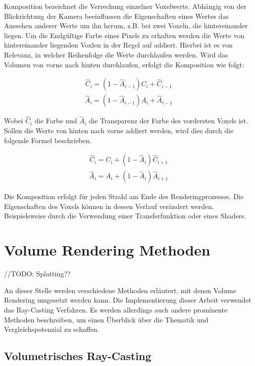 Komposition bezeichnet die Verrechung einzelner Voxelwerte. Abhängig von der Blickrichtung der Kamera beeinflussen die Eigenschaften eines Wertes das Aussehen anderer Werte um ihn herum, z.B. bei zwei Voxeln, die hintereinander liegen. Um die Endgültige Farbe eines Pixels zu erhalten werden die Werte von hintereinander liegenden Voxlen in der Regel auf addiert. Hierbei ist es von Relevanz, in welcher Reihenfolge die Werte durchlaufen werden. Wird das Volumen von vorne nach hinten durchlaufen, erfolgt die Komposition wie folgt:

\begin{align}
\hat{C}_{i}=(1-\hat{A}_{i-1})C_{i}+\hat{C}_{i-1}
\end{align}
\begin{align}
\hat{A}_{i}=(1-\hat{A}_{i-1})A_{i}+\hat{A}_{i-1}
\end{align}


Wobei $\hat{C}_{i}$ die Farbe und $\hat{A}_{i}$ die Transparenz der Farbe des vordersten Voxels ist.
Sollen die Werte von hinten nach vorne addiert werden, wird dies durch die folgende Formel beschrieben.

\begin{align}
\hat{C}_{i}=C_{i}+(1-\hat{A}_{i})\hat{C}_{i+1}
\end{align}
\begin{align}
\hat{A}_{i}=A_{i}+(1-\hat{A}_{i})\hat{A}_{i+1}
\end{align}

Die Komposition erfolgt für jeden Strahl am Ende des Renderingprozesses. Die Eigenschaften des Voxels können in dessen Verlauf verändert werden. Beispielsweise durch die Verwendung einer Transferfunktion oder eines Shaders.


\section{Volume Rendering Methoden}
//TODO:
Splatting??

An dieser Stelle werden verschiedene Methoden erläutert, mit denen Volume Rendering umgesetzt werden kann. Die Implementierung dieser Arbeit verwendet das Ray-Casting Verfahren. Es werden allerdings auch andere prominente Methoden beschreiben, um einen Überblick über die Thematik und Vergleichspotenzial zu schaffen.

\subsection{Volumetrisches Ray-Casting}
\label{rayCasting}

